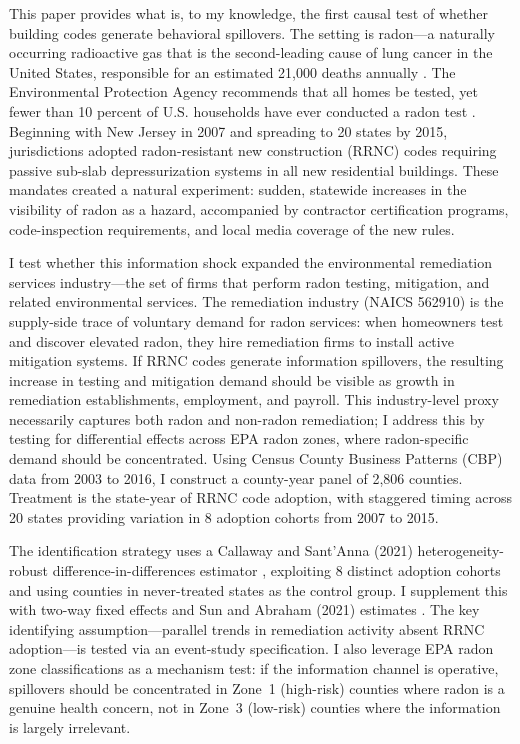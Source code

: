 \documentclass[12pt]{article}
\begin{document}
This paper provides what is, to my knowledge, the first causal test of whether building codes generate behavioral spillovers. The setting is radon---a naturally occurring radioactive gas that is the second-leading cause of lung cancer in the United States, responsible for an estimated 21,000 deaths annually \citep{epa2003assessment}. The Environmental Protection Agency recommends that all homes be tested, yet fewer than 10 percent of U.S. households have ever conducted a radon test \citep{park2021radon}. Beginning with New Jersey in 2007 and spreading to 20 states by 2015, jurisdictions adopted radon-resistant new construction (RRNC) codes requiring passive sub-slab depressurization systems in all new residential buildings. These mandates created a natural experiment: sudden, statewide increases in the visibility of radon as a hazard, accompanied by contractor certification programs, code-inspection requirements, and local media coverage of the new rules.

I test whether this information shock expanded the environmental remediation services industry---the set of firms that perform radon testing, mitigation, and related environmental services. The remediation industry (NAICS 562910) is the supply-side trace of voluntary demand for radon services: when homeowners test and discover elevated radon, they hire remediation firms to install active mitigation systems. If RRNC codes generate information spillovers, the resulting increase in testing and mitigation demand should be visible as growth in remediation establishments, employment, and payroll. This industry-level proxy necessarily captures both radon and non-radon remediation; I address this by testing for differential effects across EPA radon zones, where radon-specific demand should be concentrated. Using Census County Business Patterns (CBP) data from 2003 to 2016, I construct a county-year panel of 2,806 counties. Treatment is the state-year of RRNC code adoption, with staggered timing across 20 states providing variation in 8 adoption cohorts from 2007 to 2015.

The identification strategy uses a Callaway and Sant'Anna (2021) heterogeneity-robust difference-in-differences estimator \citep{callaway2021difference}, exploiting 8 distinct adoption cohorts and using counties in never-treated states as the control group. I supplement this with two-way fixed effects and Sun and Abraham (2021) estimates \citep{sun2021estimating}. The key identifying assumption---parallel trends in remediation activity absent RRNC adoption---is tested via an event-study specification. I also leverage EPA radon zone classifications as a mechanism test: if the information channel is operative, spillovers should be concentrated in Zone~1 (high-risk) counties where radon is a genuine health concern, not in Zone~3 (low-risk) counties where the information is largely irrelevant.
\end{document}
